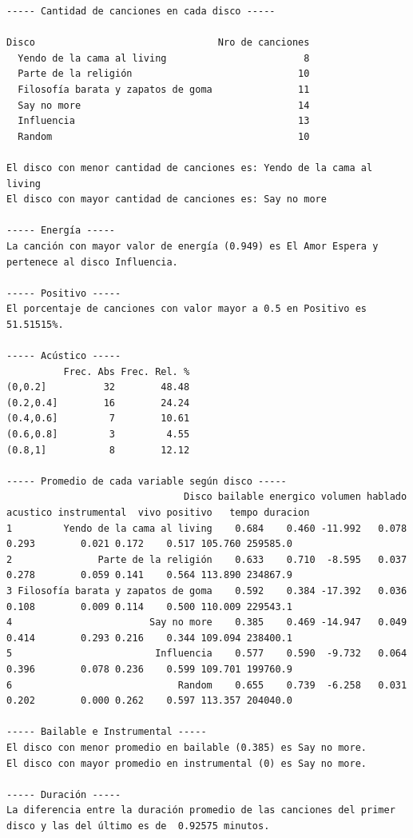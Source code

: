 \documentclass[
]{book}
\begin{document}
\begin{verbatim}
----- Cantidad de canciones en cada disco -----
                                    
Disco                                Nro de canciones
  Yendo de la cama al living                        8
  Parte de la religión                             10
  Filosofía barata y zapatos de goma               11
  Say no more                                      14
  Influencia                                       13
  Random                                           10

El disco con menor cantidad de canciones es: Yendo de la cama al living 
El disco con mayor cantidad de canciones es: Say no more 

----- Energía -----
La canción con mayor valor de energía (0.949) es El Amor Espera y pertenece al disco Influencia.

----- Positivo -----
El porcentaje de canciones con valor mayor a 0.5 en Positivo es 51.51515%.

----- Acústico -----
          Frec. Abs Frec. Rel. %
(0,0.2]          32        48.48
(0.2,0.4]        16        24.24
(0.4,0.6]         7        10.61
(0.6,0.8]         3         4.55
(0.8,1]           8        12.12

----- Promedio de cada variable según disco -----
                               Disco bailable energico volumen hablado acustico instrumental  vivo positivo   tempo duracion
1         Yendo de la cama al living    0.684    0.460 -11.992   0.078    0.293        0.021 0.172    0.517 105.760 259585.0
2               Parte de la religión    0.633    0.710  -8.595   0.037    0.278        0.059 0.141    0.564 113.890 234867.9
3 Filosofía barata y zapatos de goma    0.592    0.384 -17.392   0.036    0.108        0.009 0.114    0.500 110.009 229543.1
4                        Say no more    0.385    0.469 -14.947   0.049    0.414        0.293 0.216    0.344 109.094 238400.1
5                         Influencia    0.577    0.590  -9.732   0.064    0.396        0.078 0.236    0.599 109.701 199760.9
6                             Random    0.655    0.739  -6.258   0.031    0.202        0.000 0.262    0.597 113.357 204040.0

----- Bailable e Instrumental -----
El disco con menor promedio en bailable (0.385) es Say no more.
El disco con mayor promedio en instrumental (0) es Say no more.

----- Duración -----
La diferencia entre la duración promedio de las canciones del primer disco y las del último es de  0.92575 minutos.
\end{verbatim}
\end{document}
